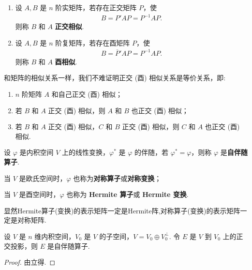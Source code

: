 \documentclass[../../main.tex]{subfiles}
\begin{document}
\begin{definition}[正交相似和酉相似]
\begin{enumerate}
\item 设 $A,B$ 是 $n$ 阶实矩阵，若存在正交矩阵 $P$，使 
\begin{align*}
B = P'AP=P^{-1}AP.
\end{align*}
则称 $B$ 和 $A$ \textbf{正交相似}. 

\item 设 $A,B$ 是 $n$ 阶复矩阵，若存在酉矩阵 $P$，使 
\begin{align*}
B = \overline{P}'AP=P^{-1}AP.
\end{align*}
则称 $B$ 和 $A$ \textbf{酉相似}.
\end{enumerate}
\end{definition}
\begin{remark}
和矩阵的相似关系一样，我们不难证明正交 (酉) 相似关系是等价关系，即:
\begin{enumerate}
\item $n$ 阶矩阵 $A$ 和自己正交 (酉) 相似；

\item 若 $B$ 和 $A$ 正交 (酉) 相似，则 $A$ 和 $B$ 也正交 (酉) 相似；

\item 若 $B$ 和 $A$ 正交 (酉) 相似，$C$ 和 $B$ 正交 (酉) 相似，则 $C$ 和 $A$ 也正交 (酉) 相似. 
\end{enumerate}
\end{remark}

\begin{definition}[自伴随算子]
设 $\varphi$ 是内积空间 $V$ 上的线性变换，$\varphi^*$ 是 $\varphi$ 的伴随，若 $\varphi^* = \varphi$，则称 $\varphi$ 是\textbf{自伴随算子}. 

当 $V$ 是欧氏空间时，$\varphi$ 也称为\textbf{对称算子}或\textbf{对称变换}；

当 $V$ 是酉空间时，$\varphi$ 也称为 \textbf{Hermite 算子}或 \textbf{Hermite 变换}.
\end{definition}
\begin{remark}
显然Hermite算子(变换)的表示矩阵一定是Hermite阵,对称算子(变换)的表示矩阵一定是对称矩阵.
\end{remark}

\begin{proposition}
设 $V$ 是 $n$ 维内积空间，$V_0$ 是 $V$ 的子空间，$V = V_0 \oplus V_0^\perp$. 令 $E$ 是 $V$ 到 $V_0$ 上的正交投影，则 $E$ 是自伴随算子. 
\end{proposition}
\begin{proof}
由立得.
\end{proof}
\end{document}
